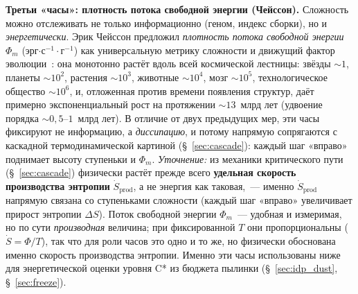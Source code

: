 \documentclass[12pt,a4paper]{article}
\begin{document}
\textbf{Третьи «часы»: плотность потока свободной энергии (Чейссон).} Сложность можно отслеживать не только информационно (геном, индекс сборки), но и \emph{энергетически}. Эрик Чейссон предложил \emph{плотность потока свободной энергии} $\Phi_m$ (эрг$\cdot$с$^{-1}\cdot$г$^{-1}$) как универсальную метрику сложности и движущий фактор эволюции~\cite{Chaisson2011}: она монотонно растёт вдоль всей космической лестницы: звёзды $\sim 1$, планеты $\sim 10^2$, растения $\sim 10^3$, животные $\sim 10^4$, мозг $\sim 10^5$, технологическое общество $\sim 10^6$, и, отложенная против времени появления структур, даёт примерно экспоненциальный рост на протяжении $\sim 13$~млрд лет (удвоение порядка $\sim 0{,}5$--$1$~млрд лет). В отличие от двух предыдущих мер, эти часы фиксируют не информацию, а \emph{диссипацию}, и потому напрямую сопрягаются с каскадной термодинамической картиной (\S~\ref{sec:cascade}): каждый шаг «вправо» поднимает высоту ступеньки и $\Phi_m$. \emph{Уточнение:} из механики критического пути (\S~\ref{sec:cascade}) физически растёт прежде всего \textbf{удельная скорость производства энтропии} $\dot S_{\mathrm{prod}}$, а не энергия как таковая,~--- именно $\dot S_{\mathrm{prod}}$ напрямую связана со ступеньками сложности (каждый шаг «вправо» увеличивает прирост энтропии $\Delta S$). Поток свободной энергии $\Phi_m$~--- удобная и измеримая, но по сути \emph{производная} величина; при фиксированной $T$ они пропорциональны ($\dot S = \Phi/T$), так что для роли часов это одно и то же, но физически обоснована именно скорость производства энтропии. Именно эти часы использованы ниже для энергетической оценки уровня C* из бюджета пылинки (\S~\ref{sec:idp_dust}, \S~\ref{sec:freeze}).
\end{document}
